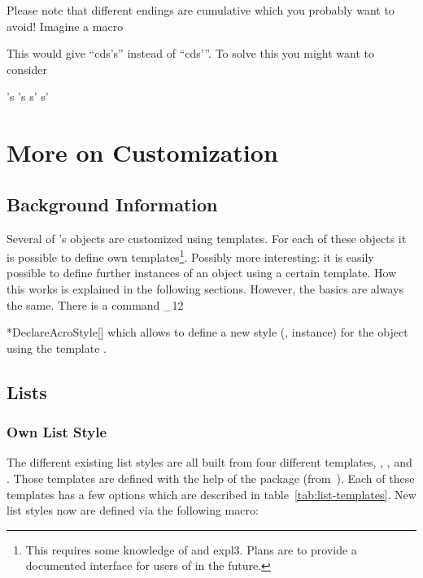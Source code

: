 \documentclass[load-preamble+]{cnltx-doc}
\makeatletter
\renewenvironment{commands}
  {%
    \cnltx@set@catcode_{12}%
    \let\command\cnltx@command
    \cnltxlist
  }
  {\endcnltxlist}
\makeatother
\begin{document}
Please note that different endings are cumulative which you probably want to
avoid! Imagine a macro
This would give \enquote{\ac{cd}s's} instead of \enquote{\ac{cd}s'}.  To solve
this you might want to consider
\begin{sourcecode}
     {'s} {'s}
       {s'} {s'}
\end{sourcecode}

\section{More on Customization}\label{sec:more-custom}
\subsection{Background Information}
Several of \acro's objects are customized using templates.  For each of these
objects it is possible to define own templates\footnote{This requires some
knowledge of  and expl3.  Plans are to provide a documented
interface for users of \acro{} in the future.}.  Possibly more interesting: it
is easily possible to define further instances of an object using a certain
template.  How this works is explained in the following sections. However, the
basics are always the same.  There is a command
\begin{commands}
  \command*{DeclareAcroStyle}[]
    which allows to define a new style (\ie, instance) for the object
     using the template .
\end{commands}

\subsection{Lists}\label{sec:lists}
\subsubsection{Own List Style}

The different existing list styles are all built from four different
templates, , ,  and .
Those templates are defined with the help of the 
package (from~\cite{bnd:l3packages}).  Each of these templates has a few
options which are described in table~\vref{tab:list-templates}.  New list
styles now are defined via the following macro:
\end{document}
